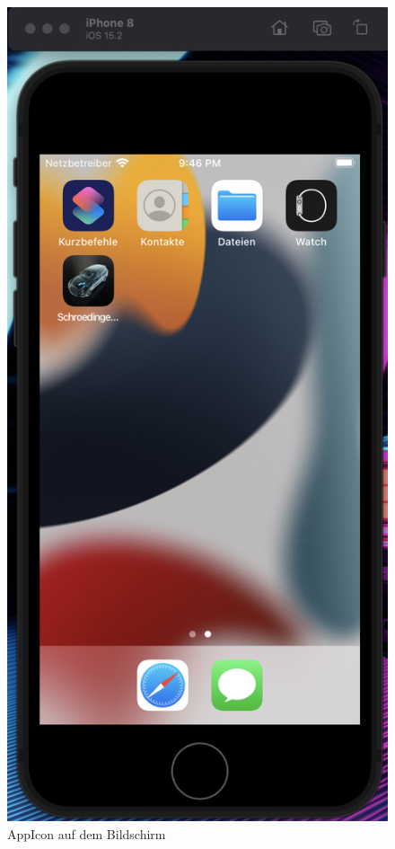 \begin{figure} [H]
	\begin{center}
		\includegraphics[width=1\textwidth]{Bilder/iOS_icon.png}
		\caption{AppIcon auf dem Bildschirm}
		\label{AppIcon}
	\end{center}
\end{figure}
